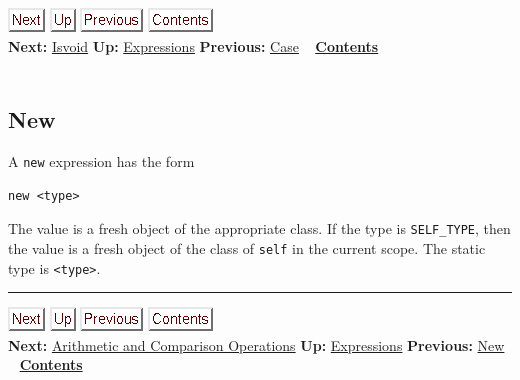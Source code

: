 \documentclass[]{article}
\begin{document}
\href{node24.html}{\includegraphics{next.png}}
\href{node13.html}{\includegraphics{up.png}}
\href{node22.html}{\includegraphics{prev.png}}
\href{node1.html}{\includegraphics{contents.png}} \\ \textbf{Next:}
\href{node24.html}{Isvoid} \textbf{Up:} \href{node13.html}{Expressions}
\textbf{Previous:} \href{node22.html}{Case} ~
\textbf{\href{node1.html}{Contents}} \\ \\

\subsection{New}

A \texttt{new} expression has the form

\begin{verbatim}
new <type>
\end{verbatim}

The value is a fresh object of the appropriate class. If the type is
\texttt{SELF\_TYPE}, then the value is a fresh object of the class of
\texttt{self} in the current scope. The static type is
\texttt{\textless{}type\textgreater{}}.

\begin{center}\rule{3in}{0.4pt}\end{center}

\href{node25.html}{\includegraphics{next.png}}
\href{node13.html}{\includegraphics{up.png}}
\href{node23.html}{\includegraphics{prev.png}}
\href{node1.html}{\includegraphics{contents.png}} \\ \textbf{Next:}
\href{node25.html}{Arithmetic and Comparison Operations} \textbf{Up:}
\href{node13.html}{Expressions} \textbf{Previous:}
\href{node23.html}{New} ~ \textbf{\href{node1.html}{Contents}} \\ \\
\end{document}
